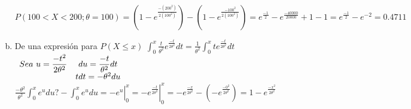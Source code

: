 \documentclass[12pt, letterpaper]{article}
\begin{document}
\begin{enumerate}[a)]
		$P(100<X<200;\theta=100)=\left(1-e^{\frac{-(200^2)}{2(100^2)}}\right)-\left(1-e^{\frac{-100^2}{2(100^2)}}\right)=e^{\frac{-1}{2}}-e^{\frac{-40000}{20000}}+1-1=e^{\frac{-1}{2}}-e^{-2}=0.4711$
	\item De una expresión para $P(X\leq x)$\vskip0.01cm
		$\displaystyle\int_0^x\frac{t}{\theta^2}e^{\frac{-t}{2\theta^2}}dt=\displaystyle\frac{1}{\theta^2}\int_0^xte^{\frac{-t}{2\theta^2}}dt$
		$\begin{array}{l c}
			Sea\ u=\displaystyle\frac{-t^2}{2\theta^2} & du = \displaystyle\frac{-t}{\theta^2}dt\\
		 	& tdt=-\theta^2du
		\end{array}$\vskip0.1cm
		$\left.\displaystyle\frac{-\theta^2}{\theta^2}\int_0^xe^udu?-\displaystyle\int_0^xe^udu=-e^u\right|_0^x=\left.-e^{\frac{-t}{2\theta^2}}\right|_0^x=-e^{\frac{-x}{2\theta^2}}-(-e^{\frac{-0^2}{2\theta^2}})=1-e^{\frac{-x^2}{2\theta^2}}$

\end{enumerate}
\vskip1cm
\end{document}
